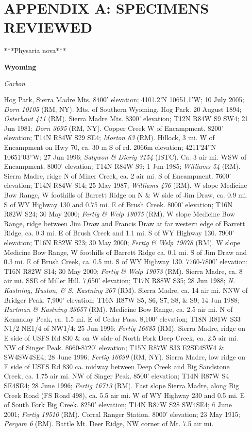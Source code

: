 \chapter*{APPENDIX A: SPECIMENS REVIEWED}

***Physaria nova***

\textbf{Wyoming} %

\textit{Carbon}

Hog Park, Sierra Madre Mts. 8400’ elevation; 4101.2’N 10651.1’W; 10 July 2005; \textit{Dorn 10105} (RM, NY).  Mts. of Southern Wyoming, Hog Park. 20 August 1894; \textit{Osterhout 411} (RM).  Sierra Madre Mts. 8300’ elevation; T12N R84W S9 SW4; 21 Jun 1981; \textit{Dorn 3695} (RM, NY).  Copper Creek W of Encampment. 8200’ elevation; T14N R84W S29 SE4; \textit{Morton 63} (RM).  Hillock, 3 mi. W of Encampment on Hwy 70, ca. 30 m S of rd. 2066m elevation; 4211’24”N 10651’03”W; 27 Jun 1996; \textit{Salywon \& Dierig 3154} (ISTC).  Ca. 3 air mi. WSW of Encampment. 8000’ elevation; T14N R84W S9; 1 Jun 1985; \textit{Williams 54} (RM).  Sierra Madre, ridge N of Miner Creek, ca. 2 air mi. S of Encampment. 7600’ elevation; T14N R84W S14; 25 May 1987; \textit{Williams 476} (RM).  W slope Medicine Bow Range, W foothills of Barrett Ridge on N \& W side of Jim Draw, ca. 0.9 mi. S of WY Highway 130 and 0.75 mi. E of Brush Creek. 8000’ elevation; T16N R82W S24; 30 May 2000; \textit{Fertig \& Welp 19075} (RM).  W slope Medicine Bow Range, ridge between Jim Draw and Francis Draw at far western edge of Barrett Ridge, ca. 0.3 mi. E of Brush Creek and 1.1 mi. S of WY Highway 130. 7900’ elevation; T16N R82W S23; 30 May 2000; \textit{Fertig \& Welp 19078} (RM).  W slope Medicine Bow Range, W foothills of Barrett Ridge ca. 0.1 mi. S of Jim Draw and 0.3 mi. E of Brush Creek, ca. 0.5 mi. S of WY Highway 130. 7760-7800’ elevation; T16N R82W S14; 30 May 2000; \textit{Fertig \& Welp 19073} (RM).  Sierra Madre, ca. 8 air mi. SSE of Miller Hill.  7,650’ elevation; T17N R88W S35; 28 Jun 1988; \textit{N. Kastning, Huston, \& S. Kastning 267} (RM).    Sierra Madre, ca. 14 air mi. NNW of Bridger Peak.  7,900’ elevation; T16N R87W S5, S6, S7, S8, \& S9; 14 Jun 1988; \textit{Hartman \& Kastning 23657} (RM).  Medicine Bow Range, ca. 2.5 air mi. N of Kennaday Peak, ca. 1.5 mi. E of Cedar Pass. 8,100’ elevation; T18N R81W S33 N1/2 NE1/4 of NW1/4; 25 Jun 1996; \textit{Fertig 16685} (RM).  Sierra Madre, ridge on E side of USFS Rd 830 \& on W side of North Fork Deep Creek, ca. 2.5 air mi. NW of Singer Peak. 8660-8720’ elevation; T15N R87W S33 E2SE4SW4 \& SW4SW4SE4; 28 June 1996; \textit{Fertig 16699} (RM, NY).  Sierra Madre, low ridge on E side of USFS Rd 830 ca. midway between Deep Creek and Big Sandstone Creek, ca. 1.75 air mi. NW of Singer Peak. 8500’ elevation; T14N R87W S4 SE4SE4; 28 June 1996; \textit{Fertig 16713} (RM).   East slope Sierra Madre, along Big Creek Road (FS Road 498), ca. 5.5 air mi. W of WY Highway 230 and 0.5 mi. E of South Fork Big Creek. 8250’ elevation; T14N R87W S28 SW4SE4; 6 June 2001; \textit{Fertig 19510} (RM).   Corral Ranger Station. 8000’ elevation; 23 May 1915; \textit{Peryam 6} (RM).  Battle Mt. Deer Ridge, NW corner of Mt.  7.5 air mi. 